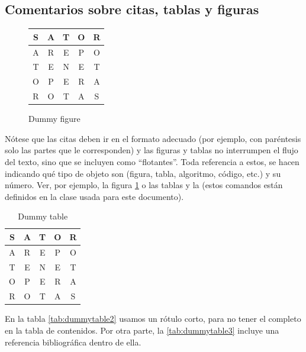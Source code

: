 \subsection{Comentarios sobre citas, tablas y figuras}

\begin{figure}[htbp]
	\centering
	\begin{tabular}{|c|c|c|c|c|} \hline
		S & A & T & O & R\\ \hline
		A & R & E & P & O\\ \hline
		T & E & N & E & T\\ \hline
		O & P & E & R & A\\ \hline
		R & O & T & A & S\\ \hline
	\end{tabular}
	
	\caption{Dummy figure}
	\label{fig:dummyfigure1}
\end{figure}

Nótese que las citas deben ir en el formato adecuado (por ejemplo, con paréntesis solo las partes que le corresponden) y las figuras y tablas no interrumpen el flujo del texto, sino que se incluyen como ``flotantes''. Toda referencia a estos, se hacen indicando qué tipo de objeto son (figura, tabla, algoritmo, código, etc.) y su número. Ver, por ejemplo, la figura \ref{fig:dummyfigure1} o las tablas  y la  (estos comandos están definidos en la clase usada para este documento).

\begin{table}[htbp]
	\centering
	\begin{tabular}{|c|c|c|c|c|} \hline
        S & A & T & O & R\\ \hline
        A & R & E & P & O\\ \hline
        T & E & N & E & T\\ \hline
        O & P & E & R & A\\ \hline
        R & O & T & A & S\\ \hline
    \end{tabular}
    
    \caption{Dummy table}
    \label{tab:dummytable1}
\end{table}

En la tabla \ref{tab:dummytable2} usamos un rótulo corto, para no tener el completo en la tabla de contenidos. Por otra parte, la \ref{tab:dummytable3} incluye una referencia bibliográfica dentro de ella.

